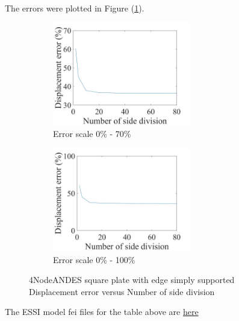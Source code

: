 \documentclass[fleqn,11pt,letter]{article}
\begin{document}

The errors were plotted in Figure (\ref{fig 4NodeANDES square plate with four edge simply supported}).
\begin{figure}[H]
  \begin{subfigure}{0.5\textwidth}
    \centering
    \includegraphics[width=6cm]{../Figure_files/4NodeANDES/error4andes_square_plate_simply_supported.jpeg}
    \caption{Error scale 0\% - 70\%}
  \end{subfigure}
  \begin{subfigure}{0.5\textwidth}
    \centering
    \includegraphics[width=6cm]{../Figure_files/4NodeANDES/error4andes_square_plate_simply_supported100.jpeg}
    \caption{Error scale 0\% - 100\%}
  \end{subfigure}
  \captionsetup{justification=centering,margin=2cm}
  \caption{4NodeANDES square plate with edge simply supported\\
      Displacement error   versus   Number of side division}
  \label{fig 4NodeANDES square plate with four edge simply supported}
\end{figure}


The ESSI model fei files for the table above are \href{https://github.com/yuan-energy/ESSI_Verification/blob/master/4NodeANDES/square_plate_simply_support/square_plate_simply_support.tar.gz?raw=true}{here}
\end{document}
